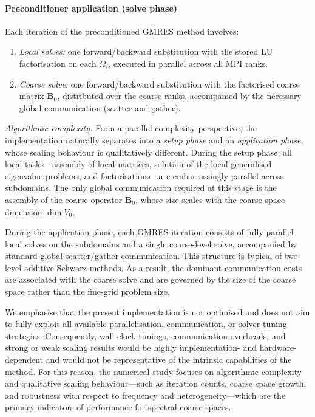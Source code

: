 \documentclass[preprint,3p,times]{elsarticle}
\theoremstyle{definition}
\numberwithin{equation}{section}
\begin{document}
\paragraph{Preconditioner application (solve phase)}
Each iteration of the preconditioned GMRES method involves:
\begin{enumerate}
  \item \emph{Local solves:} one forward/backward substitution with the stored LU factorisation on each $\Omega_i$, executed in parallel across all MPI ranks. 
  \item \emph{Coarse solve:} one forward/backward substitution with the factorised coarse matrix $\mathbf{B}_0$, distributed over the coarse ranks, 
  accompanied by the necessary global communication (scatter and gather).
\end{enumerate}
{\textit{Algorithmic complexity.}
From a parallel complexity perspective, the implementation naturally separates into a \emph{setup phase} and an \emph{application phase}, 
whose scaling behaviour is qualitatively different. 
During the setup phase, all local tasks---assembly of local matrices, solution of the local generalised eigenvalue problems, 
and factorisations---are embarrassingly parallel across subdomains. 
The only global communication required at this stage is the assembly of the coarse operator $\mathbf{B}_0$, 
whose size scales with the coarse space dimension $\dim V_0$.}

{During the application phase, each GMRES iteration consists of fully parallel local solves 
on the subdomains and a single coarse-level solve, accompanied by standard global scatter/gather communication. 
This structure is typical of two-level additive Schwarz methods. 
As a result, the dominant communication costs are associated with the coarse solve and are governed by the size of the coarse space 
rather than the fine-grid problem size.
}

{We emphasise that the present implementation is not optimised and does not aim to fully exploit all available parallelisation, 
communication, or solver-tuning strategies. 
Consequently, wall-clock timings, communication overheads, and strong or weak scaling results would be highly implementation- and hardware-dependent 
and would not be representative of the intrinsic capabilities of the method. 
For this reason, the numerical study focuses on algorithmic complexity and qualitative scaling behaviour---such as iteration counts, 
coarse space growth, and robustness with respect to frequency and heterogeneity---which are the primary indicators of performance 
for spectral coarse spaces.
}
\end{document}
